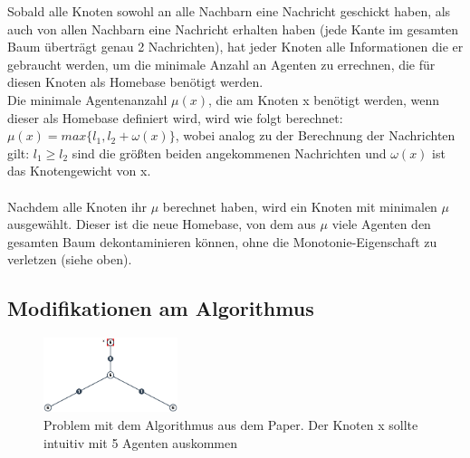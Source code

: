 Sobald alle Knoten sowohl an alle Nachbarn eine Nachricht geschickt haben, als auch von allen Nachbarn eine Nachricht erhalten haben (jede Kante im gesamten Baum überträgt genau 2 Nachrichten), hat jeder Knoten alle Informationen die er gebraucht werden, um die minimale Anzahl an Agenten zu errechnen, die für diesen Knoten als Homebase benötigt werden.
\\
Die minimale Agentenanzahl $\mu(x)$, die am Knoten x benötigt werden, wenn dieser als Homebase definiert wird, wird wie folgt berechnet:
\\
$\mu(x) = max\{l_{1},  l_{2} + \omega(x)\}$, wobei analog zu der Berechnung der Nachrichten gilt: $l_{1} \ge l_{2}$ sind die größten beiden angekommenen Nachrichten und $\omega(x)$ ist das Knotengewicht von x.
\\
\\
Nachdem alle Knoten ihr $\mu$ berechnet haben, wird ein Knoten mit minimalen $\mu$ ausgewählt. Dieser ist die neue Homebase, von dem aus $\mu$ viele Agenten den gesamten Baum dekontaminieren können, ohne die Monotonie-Eigenschaft zu verletzen (siehe oben).

\newpage

\subsection{Modifikationen am Algorithmus}\label{modifizierterAlgoChapter}


	\begin{figure}
		\begin{center}
			\includegraphics[width=0.35\textwidth]{bilder/abb_paper_problem.png}
		\end{center}
		\caption{Problem mit dem Algorithmus aus dem Paper. Der Knoten x sollte intuitiv mit 5 Agenten auskommen}
		\label{fig:negBeispielPaperAlgo}
	\end{figure}

